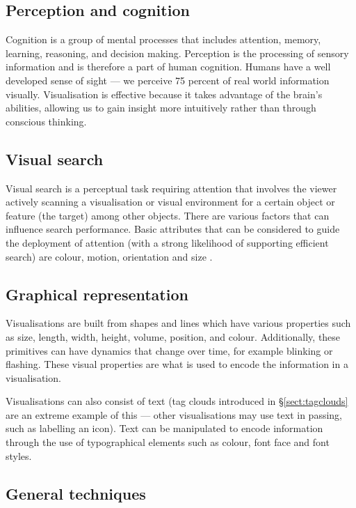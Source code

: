 \subsection{Perception and cognition}

Cognition is a group of mental processes that includes attention, memory, learning, reasoning, and decision making. Perception is the processing of sensory information and is therefore a part of human cognition. Humans have a well developed sense of sight --- we perceive 75 percent of real world information visually. Visualisation is effective because it takes advantage of the brain's abilities, allowing us to gain insight more intuitively rather than through conscious thinking. 

\subsection{Visual search}

Visual search is a perceptual task requiring attention that involves the viewer actively scanning a visualisation or visual environment for a certain object or feature (the target) among other objects. There are various factors that can influence search performance. Basic attributes that can be considered to guide the deployment of attention (with a strong likelihood of supporting efficient search) are colour, motion, orientation and size \citep{wolfe04}.

\subsection{Graphical representation}

Visualisations are built from shapes and lines which have various properties such as size, length, width, height, volume, position, and colour. Additionally, these primitives can have dynamics that change over time, for example blinking or flashing. These visual properties are what is used to encode the information in a visualisation.

Visualisations can also consist of text (tag clouds introduced in \S\ref{sect:tagclouds} are an extreme example of this --- other visualisations may use text in passing, such as labelling an icon). Text can be manipulated to encode information through the use of typographical elements such as colour, font face and font styles.

\subsection{General techniques}

